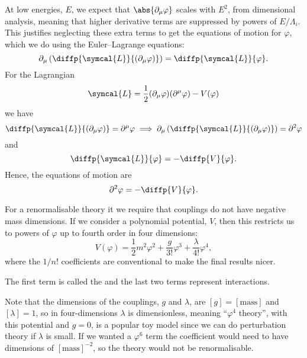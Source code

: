 \documentclass[fleqn]{NotesClass}
\newcommand{\dalembertian}{\partial^2}
\newcommand{\lagrangianDensity}{\symcal{L}}
\begin{document}
    At low energies, \(E\), we expect that \(\abs{\partial_\mu \varphi}\) scales with \(E^2\), from dimensional analysis, meaning that higher derivative terms are suppressed by powers of \(E/\Lambda_i\).
    This justifies neglecting these extra terms to get the equations of motion for \(\varphi\), which we do using the Euler--Lagrange equations:
    \begin{equation}
        \partial_\mu\left( \diffp{\lagrangianDensity}{(\partial_\mu \varphi)} \right) = \diffp{\lagrangianDensity}{\varphi}.
    \end{equation}
    For the Lagrangian
    \begin{equation}
        \lagrangianDensity = \frac{1}{2}(\partial_\mu \varphi)(\partial^\mu \varphi) - V(\varphi)
    \end{equation}
    we have
    \begin{equation}
        \diffp{\lagrangianDensity}{(\partial_\mu \varphi)} = \partial^\mu \varphi \implies \partial_\mu \left( \diffp{\lagrangianDensity}{(\partial_\mu \varphi)} \right) = \dalembertian \varphi
    \end{equation}
    and
    \begin{equation}
        \diffp{\lagrangianDensity}{\varphi} = -\diffp{V}{\varphi}.
    \end{equation}
    Hence, the equations of motion are
    \begin{equation}
        \dalembertian \varphi = - \diffp{V}{\varphi}.
    \end{equation}
    
    For a renormalisable theory it we require that couplings do not have negative mass dimensions.
    If we consider a polynomial potential, \(V\), then this restricts us to powers of \(\varphi\) up to fourth order in four dimensions:
    \begin{equation}
        V(\varphi) = \frac{1}{2}m^2\varphi^2 + \frac{g}{3!}\varphi^3 + \frac{\lambda}{4!}\varphi^4,
    \end{equation}
    where the \(1/n!\) coefficients are conventional to make the final results nicer.
    
    The first term is called the  and the last two terms represent interactions.
    
    Note that the dimensions of the couplings, \(g\) and \(\lambda\), are \([g] = [\text{mass}]\) and \([\lambda] = 1\), so in four-dimensions \(\lambda\) is dimensionless, meaning \enquote{\(\varphi^4\) theory}, with this potential and \(g = 0\), is a popular toy model since we can do perturbation theory if \(\lambda\) is small.
    If we wanted a \(\varphi^6\) term the coefficient would need to have dimensions of \([\text{mass}]^{-2}\), so the theory would not be renormalisable.
    
\end{document}

